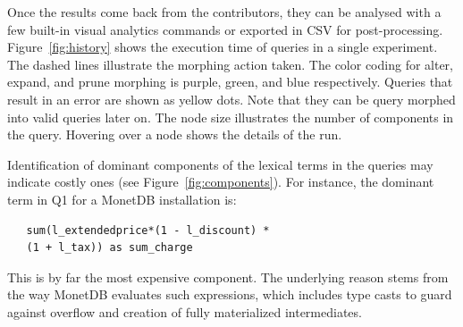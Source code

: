 \documentclass{cidr-2019}
\begin{document}
Once the results come back from the contributors, they can be analysed
with a few built-in visual analytics commands or exported in CSV for
post-processing. Figure~\ref{fig:history} shows the execution time of
queries in a single experiment. The dashed lines illustrate the
morphing action taken. The color coding for alter, expand, and prune
morphing is purple, green, and blue respectively. Queries that result
in an error are shown as yellow dots. Note that they can be query morphed into
valid queries later on. The node size illustrates the number of
components in the query. Hovering over a node shows the details of the run.

Identification of dominant components 
of the lexical terms in the queries may indicate
costly ones (see Figure~\ref{fig:components}). For instance, the
dominant term in Q1
for a MonetDB installation is:
\begin{verbatim}
   sum(l_extendedprice*(1 - l_discount) * 
   (1 + l_tax)) as sum_charge
\end{verbatim}
This is by far the most expensive component. The underlying reason
stems from the way MonetDB evaluates such expressions, which includes
type casts to guard against overflow and creation of fully
materialized intermediates.
\end{document}
